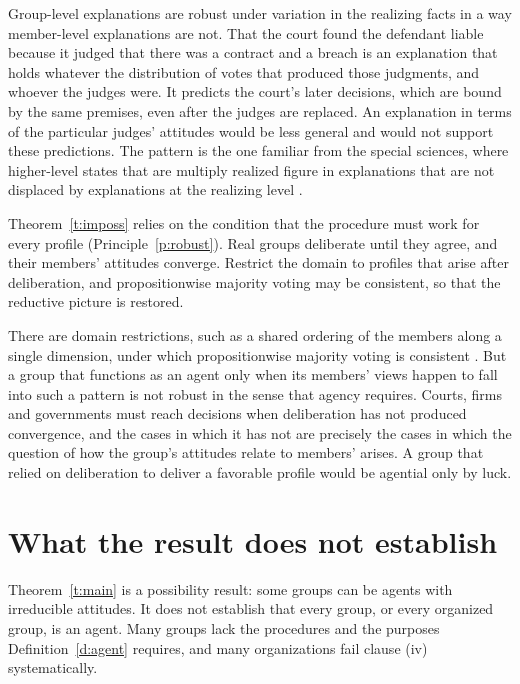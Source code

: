 \documentclass{situationist-preprint}
\begin{document}
\begin{reply}
Group-level explanations are robust under variation in the realizing facts in a way member-level explanations are not. That the court found the defendant liable because it judged that there was a contract and a breach is an explanation that holds whatever the distribution of votes that produced those judgments, and whoever the judges were. It predicts the court's later decisions, which are bound by the same premises, even after the judges are replaced. An explanation in terms of the particular judges' attitudes would be less general and would not support these predictions. The pattern is the one familiar from the special sciences, where higher-level states that are multiply realized figure in explanations that are not displaced by explanations at the realizing level \citep[ch.~1]{ListPettit2011}.
\end{reply}

\begin{objection}[Fragility]
Theorem~\ref{t:imposs} relies on the condition that the procedure must work for every profile (Principle~\ref{p:robust}). Real groups deliberate until they agree, and their members' attitudes converge. Restrict the domain to profiles that arise after deliberation, and propositionwise majority voting may be consistent, so that the reductive picture is restored.
\end{objection}

\begin{reply}
There are domain restrictions, such as a shared ordering of the members along a single dimension, under which propositionwise majority voting is consistent \citep{ListPettit2011}. But a group that functions as an agent only when its members' views happen to fall into such a pattern is not robust in the sense that agency requires. Courts, firms and governments must reach decisions when deliberation has not produced convergence, and the cases in which it has not are precisely the cases in which the question of how the group's attitudes relate to members' arises. A group that relied on deliberation to deliver a favorable profile would be agential only by luck.
\end{reply}

\section{What the result does not establish}\label{s:limits}

Theorem~\ref{t:main} is a possibility result: some groups can be agents with irreducible attitudes. It does not establish that every group, or every organized group, is an agent. Many groups lack the procedures and the purposes Definition~\ref{d:agent} requires, and many organizations fail clause (iv) systematically.
\end{document}
